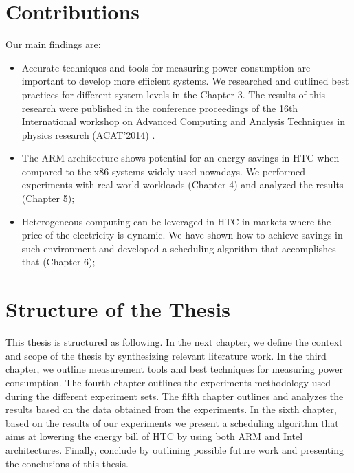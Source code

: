    
\section{Contributions}
Our main findings are: 

\begin{itemize}
  \item Accurate techniques and tools for measuring power consumption are important to develop more efficient systems. We researched and outlined best practices for different system levels in the Chapter 3. The results of this research were published in the conference proceedings of the 16th International workshop on Advanced Computing and Analysis Techniques in physics research (ACAT'2014) \cite{ACAT}.

  \item The ARM architecture shows potential for an energy savings in HTC when compared to the x86 systems widely used nowadays. We performed experiments with real world workloads (Chapter 4) and analyzed the results (Chapter 5); 

  \item Heterogeneous computing can be leveraged in HTC in markets where the price of the electricity is dynamic. We have shown how to achieve savings in such environment and developed a scheduling algorithm that accomplishes that (Chapter 6);
\end{itemize}



\section{Structure of the Thesis}
This thesis is structured as following. In the next chapter, we define the context and scope
of the thesis by synthesizing relevant literature work. In the third chapter, we
outline measurement tools and best techniques for measuring power consumption. The fourth chapter outlines the
experiments methodology used during the different experiment sets. The fifth chapter outlines and analyzes the results based on
the data obtained from the experiments. In the sixth chapter, based on the results of our experiments we present a scheduling algorithm that aims at lowering the energy bill of HTC by using both ARM and Intel architectures. Finally, conclude by outlining possible future work and presenting the
conclusions of this thesis.
